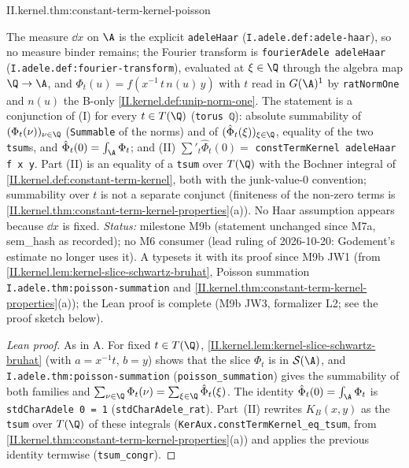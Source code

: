 \begin{tfformal}{II.kernel.thm:constant-term-kernel-poisson}
\begin{tffidelity}
The measure $\dd x$ on $\A$ is the explicit \texttt{adeleHaar} (\texttt{I.adele.def:adele-haar}), so no measure binder remains; the Fourier transform is \texttt{fourierAdele adeleHaar} (\texttt{I.adele.def:fourier-transform}), evaluated at $\xi\in\Q$ through the algebra map $\Q\to\A$, and $\Phi_t(u)=f(x^{-1}\,t\,n(u)\,y)$ with $t$ read in $G(\A)^1$ by \texttt{ratNormOne} and $n(u)$ the B-only \cref{II.kernel.def:unip-norm-one}. The statement is a conjunction of (I) for every $t\in T(\Q)$ (\texttt{torus ℚ}): absolute summability of $(\Phi_t(\nu))_{\nu\in\Q}$ (\texttt{Summable} of the norms) and of $(\hat\Phi_t(\xi))_{\xi\in\Q}$, equality of the two \texttt{tsum}s, and $\hat\Phi_t(0)=\int_\A\Phi_t$; and (II) $\sum'_{t}\hat\Phi_t(0)=$ \texttt{constTermKernel adeleHaar f x y}. Part (II) is an equality of a \texttt{tsum} over $T(\Q)$ with the Bochner integral of \cref{II.kernel.def:constant-term-kernel}, both with the junk-value-$0$ convention; summability over $t$ is not a separate conjunct (finiteness of the non-zero terms is \cref{II.kernel.thm:constant-term-kernel-properties}(a)). No Haar assumption appears because $\dd x$ is fixed. \emph{Status:} milestone M9b (statement unchanged since M7a, sem\_hash as recorded); no M6 consumer (lead ruling of 2026-10-20: Godement's estimate no longer uses it). A typesets it with its proof since M9b JW1 (from \cref{II.kernel.lem:kernel-slice-schwartz-bruhat}, Poisson summation \texttt{I.adele.thm:poisson-summation} and \cref{II.kernel.thm:constant-term-kernel-properties}(a)); the Lean proof is complete (M9b JW3, formalizer L2; see the proof sketch below).
\end{tffidelity}
\end{tfformal}
\begin{proof}[Lean proof]
As in A. For fixed $t\in T(\Q)$, \cref{II.kernel.lem:kernel-slice-schwartz-bruhat} (with $a=x^{-1}t$, $b=y$) shows that the slice $\Phi_t$ is in $\mathcal S(\A)$, and \texttt{I.adele.thm:poisson-summation} (\texttt{poisson\_summation}) gives the summability of both families and $\sum_{\nu\in\Q}\Phi_t(\nu)=\sum_{\xi\in\Q}\hat\Phi_t(\xi)$. The identity $\hat\Phi_t(0)=\int_\A\Phi_t$ is \texttt{stdCharAdele 0 = 1} (\texttt{stdCharAdele\_rat}). Part~(II) rewrites $K_B(x,y)$ as the \texttt{tsum} over $T(\Q)$ of these integrals (\texttt{KerAux.constTermKernel\_eq\_tsum}, from \cref{II.kernel.thm:constant-term-kernel-properties}(a)) and applies the previous identity termwise (\texttt{tsum\_congr}).
\end{proof}

